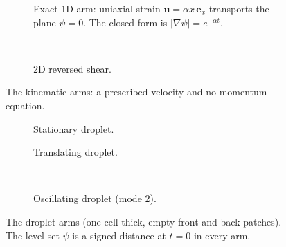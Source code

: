 \documentclass[preprint,3p,11pt]{elsarticle}
\begin{document}
\begin{figure}[p]
  \centering
  \begin{subfigure}[t]{\textwidth}\centering
    
    \caption{Exact 1D arm: uniaxial strain $\mathbf u=\alpha x\,\mathbf e_x$
      transports the plane $\psi=0$. The closed form is $|\nabla\psi|=e^{-\alpha t}$.}
    \label{fig:case-exact1D}
  \end{subfigure}\\[6pt]
  \begin{subfigure}[t]{0.55\textwidth}\centering
    
    \caption{2D reversed shear.}
    \label{fig:case-shear2D}
  \end{subfigure}
  \caption{The kinematic arms: a prescribed velocity and no momentum equation.}
  \label{fig:cases-kinematic}
\end{figure}

\begin{figure}[p]
  \centering
  \begin{subfigure}[t]{0.49\textwidth}\centering
    
    \caption{Stationary droplet.}
    \label{fig:case-stationary2D}
  \end{subfigure}\hfill
  \begin{subfigure}[t]{0.49\textwidth}\centering
    
    \caption{Translating droplet.}
    \label{fig:case-translating2D}
  \end{subfigure}\\[6pt]
  \begin{subfigure}[t]{0.49\textwidth}\centering
    
    \caption{Oscillating droplet (mode 2).}
    \label{fig:case-oscillating2D}
  \end{subfigure}
  \caption{The droplet arms (one cell thick, empty front and back patches). The level set
    $\psi$ is a signed distance at $t=0$ in every arm.}
  \label{fig:cases-droplets2D}
\end{figure}
\end{document}
